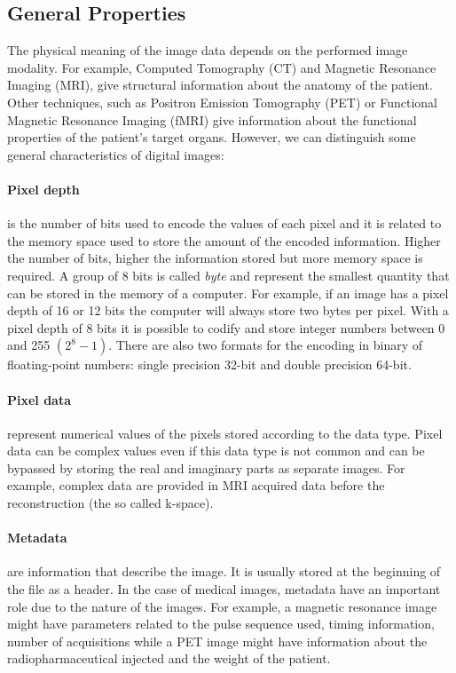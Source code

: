\documentclass{standalone}
\begin{document}
\subsection{General Properties}
The physical meaning of the image data depends on the performed image modality.
For example, Computed Tomography (CT) and Magnetic Resonance Imaging (MRI), give structural information about the anatomy of the patient.
Other techniques, such as Positron Emission Tomography (PET) or Functional Magnetic Resonance Imaging (fMRI) give information about the functional properties of the patient's target organs. 
However, we can distinguish some general characteristics of digital images:

\paragraph{Pixel depth} is the number of bits used to encode the values of each pixel and it is related to the memory space used to store the amount of the encoded information\cite{Larobina}. 
Higher the number of bits, higher the information stored but more memory space is required\cite{Larobina}. 
A group of 8 bits is called \textit{byte} and represent the smallest quantity that can be stored in the memory of a computer.
For example, if an image has a pixel depth of 16 or 12 bits the computer will always store two bytes per pixel\cite{Larobina}.
With a pixel depth of 8 bits it is possible to codify and store integer numbers between 0 and 255 $(2^8-1)$.
There are also two formats for the encoding in binary of floating-point numbers: single precision 32-bit and double precision 64-bit.

\paragraph{Pixel data} represent numerical values of the pixels stored according to the data type.
Pixel data can be complex values even if this data type is not common and can be bypassed by storing the real and imaginary parts as separate images.
For example, complex data are provided in MRI acquired data before the reconstruction (the so called k-space)\cite{Larobina}.


\paragraph{Metadata} are information that describe the image. It is usually stored at the beginning of the file as a header\cite{Larobina}. 
In the case of medical images, metadata have an important role due to the nature of the images.
For example, a magnetic resonance image might have parameters related to the pulse sequence used, timing information, number of acquisitions while a PET image might have information about the radiopharmaceutical injected and the weight of the patient.
\end{document}
